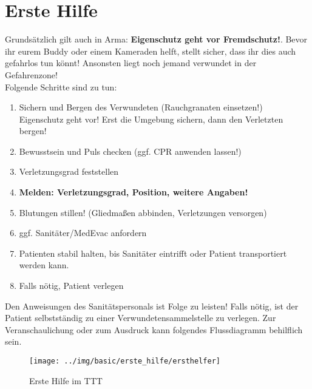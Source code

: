 \pagebreak
\section{Erste Hilfe}
Grundsätzlich gilt auch in Arma: \textbf{Eigenschutz geht vor Fremdschutz!}. Bevor ihr eurem Buddy oder einem Kameraden helft, stellt sicher, dass ihr dies auch gefahrlos tun könnt! Ansonsten liegt noch jemand verwundet in der Gefahrenzone!\\
Folgende Schritte sind zu tun:
\begin{enumerate}
	\item Sichern und Bergen des Verwundeten (Rauchgranaten einsetzen!)\\
			Eigenschutz geht vor! Erst die Umgebung sichern, dann den Verletzten bergen! 
	\item Bewusstsein und Puls checken (ggf. CPR anwenden lassen!)
	\item Verletzungsgrad feststellen
	\item \textbf{Melden: Verletzungsgrad, Position, weitere Angaben!}
	\item Blutungen stillen! (Gliedmaßen abbinden, Verletzungen versorgen)
	\item ggf. Sanitäter/MedEvac anfordern
	\item Patienten stabil halten, bis Sanitäter eintrifft oder Patient transportiert werden kann.
	\item Falls nötig, Patient verlegen
\end{enumerate}
Den Anweisungen des Sanitätspersonals ist Folge zu leisten! Falls nötig, ist der Patient selbstständig zu einer Verwundetensammelstelle zu verlegen.
Zur Veranschaulichung oder zum Ausdruck kann folgendes Flussdiagramm behilflich sein.
\begin{figure}[htbp]
		\centering
			\texttt{[image: ../img/basic/erste\_hilfe/ersthelfer]}
			\caption{Erste Hilfe im TTT}
\end{figure}
